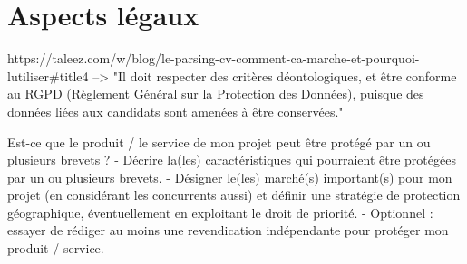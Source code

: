 \section{Aspects légaux}\label{section:aspects_legaux}

%
%


https://taleez.com/w/blog/le-parsing-cv-comment-ca-marche-et-pourquoi-lutiliser#title4
--> "Il doit respecter des critères déontologiques, et être conforme au RGPD (Règlement Général sur la Protection des Données), puisque des données liées aux candidats sont amenées à être conservées."
 
 Est-ce que le produit / le service de mon projet peut être protégé par un ou plusieurs brevets ?
- Décrire la(les) caractéristiques qui pourraient être protégées par un ou plusieurs brevets.
- Désigner le(les) marché(s) important(s) pour mon projet (en considérant les concurrents aussi) et
définir une stratégie de protection géographique, éventuellement en exploitant le droit de priorité.
- Optionnel : essayer de rédiger au moins une revendication indépendante pour protéger mon
produit / service.
